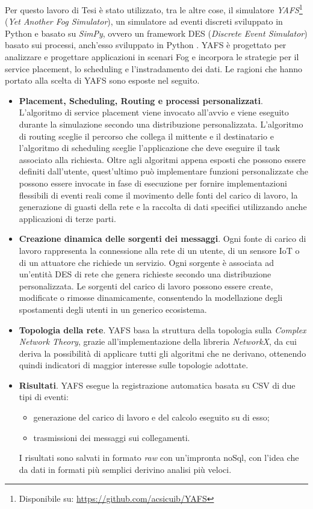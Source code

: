 Per questo lavoro di Tesi è stato utilizzato, tra le altre cose, il simulatore \textit{YAFS}\footnote{Disponibile su: \url{https://github.com/acsicuib/YAFS}} (\textit{Yet Another Fog Simulator}), un simulatore ad eventi discreti sviluppato in Python e basato su \textit{SimPy}, ovvero un framework DES (\textit{Discrete Event Simulator}) basato sui processi, anch'esso sviluppato in Python \cite{YAFSSimulator}. YAFS è progettato per analizzare e progettare applicazioni in scenari Fog e incorpora le strategie per il service placement, lo scheduling e l'instradamento dei dati. Le ragioni che hanno portato alla scelta di YAFS sono esposte nel seguito.
\begin{itemize}
	\item \textbf{Placement, Scheduling, Routing e processi personalizzati}. L'algoritmo di service placement viene invocato all'avvio e viene eseguito durante la simulazione secondo una distribuzione personalizzata. L'algoritmo di routing sceglie il percorso che collega il mittente e il destinatario e l'algoritmo di scheduling sceglie l'applicazione che deve eseguire il task associato alla richiesta. Oltre agli algoritmi appena esposti che possono essere definiti dall'utente, quest'ultimo può implementare funzioni personalizzate che possono essere invocate in fase di esecuzione per fornire implementazioni flessibili di eventi reali come il movimento delle fonti del carico di lavoro, la generazione di guasti della rete e la raccolta di dati specifici utilizzando anche applicazioni di terze parti.
	\item \textbf{Creazione dinamica delle sorgenti dei messaggi}. Ogni fonte di carico di lavoro rappresenta la connessione alla rete di un utente, di un sensore IoT o di un attuatore che richiede un servizio. Ogni sorgente è associata ad un'entità DES di rete che genera richieste secondo una distribuzione personalizzata. Le sorgenti del carico di lavoro possono essere create, modificate o rimosse dinamicamente, consentendo la modellazione degli spostamenti degli utenti in un generico ecosistema.
	\item \textbf{Topologia della rete}. YAFS basa la struttura della topologia sulla \textit{Complex Network Theory}, grazie all'implementazione della libreria \textit{NetworkX}, da cui deriva la possibilità di applicare tutti gli algoritmi che ne derivano, ottenendo quindi indicatori di maggior interesse sulle topologie adottate.
	\item \textbf{Risultati}. YAFS esegue la registrazione automatica basata su CSV di due tipi di eventi: 
	\begin{itemize}
		\item generazione del carico di lavoro e del calcolo eseguito su di esso;
		\item trasmissioni dei messaggi sui collegamenti. 
	\end{itemize}
	
	I risultati sono salvati in formato \textit{raw} con un'impronta noSql, con l'idea che da dati in formati più semplici derivino analisi più veloci.
\end{itemize}












